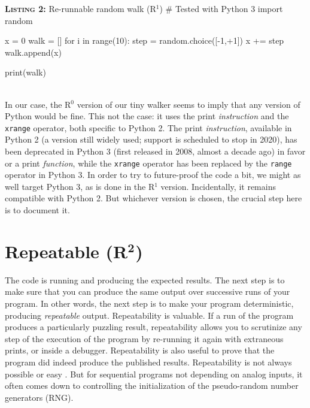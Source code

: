 \documentclass[a4paper,11pt]{article}
\begin{document}
\noindent \begin{minipage}[c]{\linewidth}
\begin{code}{\textbf{\textsc{Listing 2:}} Re-runnable random walk (R$^1$)}
# Tested with Python 3
import random

x =  0
walk = []
for i in range(10):
    step = random.choice([-1,+1])
    x += step
    walk.append(x)

print(walk)
\end{code}
\end{minipage}\\

In our case, the R$^0$ version of our tiny walker seems to imply that any version of Python would be fine. This not the case: it uses the print {\em instruction} and the {\tt xrange} operator, both specific to Python 2. The print {\em instruction}, available in Python 2 (a version still widely used; support is scheduled to stop in 2020), has been deprecated in Python 3 (first released in 2008, almost a decade ago) in favor or a  print {\em function}, while the {\tt xrange} operator has been replaced by the {\tt range} operator in Python 3. In order to try to future-proof the code a bit, we might as well target Python 3, as is done in the R$^1$ version. Incidentally, it remains compatible with Python 2. But whichever version is chosen, the crucial step here is to document it.


\section*{Repeatable (R$^{\mathbf 2}$)}

The code is running and producing the expected results. The next step is to make sure that you can produce the same output over successive runs of your program. In other words, the next step is to make your program deterministic, producing {\em repeatable} output.  Repeatability is valuable. If a run of the program produces a particularly puzzling result, repeatability allows you to scrutinize any step of the execution of the program by re-running it again with extraneous prints, or inside a debugger. Repeatability is also useful to prove that the program did indeed produce the published results. Repeatability is not always possible or easy \citep{Diethelm:2012, Courtes:2015}. But for sequential programs not depending on analog inputs, it often comes down to controlling the initialization of the pseudo-random number generators (RNG).\\
\end{document}
